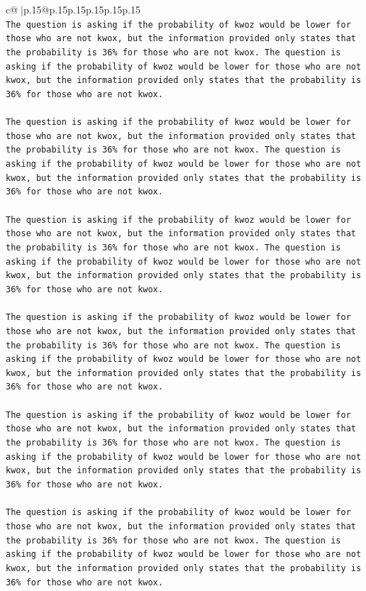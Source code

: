 \documentclass{article}
\begin{document}
{\begin{supertabular}{c@{$\;$}|p{.15\linewidth}@{}p{.15\linewidth}p{.15\linewidth}p{.15\linewidth}p{.15\linewidth}p{.15\linewidth}}
{{{\\ 
\texttt{The question is asking if the probability of kwoz would be lower for those who are not kwox, but the information provided only states that the probability is 36\% for those who are not kwox. The question is asking if the probability of kwoz would be lower for those who are not kwox, but the information provided only states that the probability is 36\% for those who are not kwox. } \\
\\ 
\texttt{The question is asking if the probability of kwoz would be lower for those who are not kwox, but the information provided only states that the probability is 36\% for those who are not kwox. The question is asking if the probability of kwoz would be lower for those who are not kwox, but the information provided only states that the probability is 36\% for those who are not kwox. } \\
\\ 
\texttt{The question is asking if the probability of kwoz would be lower for those who are not kwox, but the information provided only states that the probability is 36\% for those who are not kwox. The question is asking if the probability of kwoz would be lower for those who are not kwox, but the information provided only states that the probability is 36\% for those who are not kwox. } \\
\\ 
\texttt{The question is asking if the probability of kwoz would be lower for those who are not kwox, but the information provided only states that the probability is 36\% for those who are not kwox. The question is asking if the probability of kwoz would be lower for those who are not kwox, but the information provided only states that the probability is 36\% for those who are not kwox. } \\
\\ 
\texttt{The question is asking if the probability of kwoz would be lower for those who are not kwox, but the information provided only states that the probability is 36\% for those who are not kwox. The question is asking if the probability of kwoz would be lower for those who are not kwox, but the information provided only states that the probability is 36\% for those who are not kwox. } \\
\\ 
\texttt{The question is asking if the probability of kwoz would be lower for those who are not kwox, but the information provided only states that the probability is 36\% for those who are not kwox. The question is asking if the probability of kwoz would be lower for those who are not kwox, but the information provided only states that the probability is 36\% for those who are not kwox. } \\
}}}
\end{supertabular}}
\end{document}

